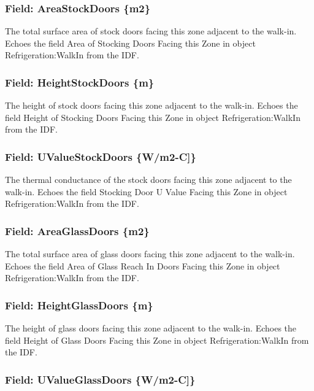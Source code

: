 \subsubsection{Field: AreaStockDoors \{m2\}}\label{field-areastockdoors-m2}

The total surface area of stock doors facing this zone adjacent to the walk-in. Echoes the field Area of Stocking Doors Facing this Zone in object Refrigeration:WalkIn from the IDF.

\subsubsection{Field: HeightStockDoors \{m\}}\label{field-heightstockdoors-m}

The height of stock doors facing this zone adjacent to the walk-in. Echoes the field Height of Stocking Doors Facing this Zone in object Refrigeration:WalkIn from the IDF.

\subsubsection{Field: UValueStockDoors \{W/m2-C{]}\}}\label{field-uvaluestockdoors-wm2-c}

The thermal conductance of the stock doors facing this zone adjacent to the walk-in. Echoes the field Stocking Door U Value Facing this Zone in object Refrigeration:WalkIn from the IDF.

\subsubsection{Field: AreaGlassDoors \{m2\}}\label{field-areaglassdoors-m2}

The total surface area of glass doors facing this zone adjacent to the walk-in. Echoes the field Area of Glass Reach In Doors Facing this Zone in object Refrigeration:WalkIn from the IDF.

\subsubsection{Field: HeightGlassDoors \{m\}}\label{field-heightglassdoors-m}

The height of glass doors facing this zone adjacent to the walk-in. Echoes the field Height of Glass Doors Facing this Zone in object Refrigeration:WalkIn from the IDF.

\subsubsection{Field: UValueGlassDoors \{W/m2-C{]}\}}\label{field-uvalueglassdoors-wm2-c}

